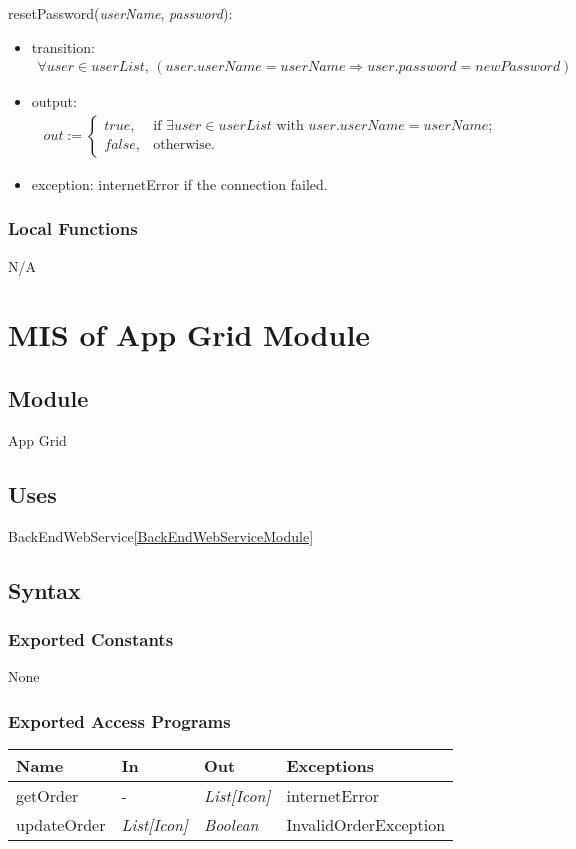 \documentclass[12pt, titlepage]{article}
\begin{document}
\noindent resetPassword(\textit{userName}, \textit{password}):
\begin{itemize}
\item transition: 
\begin{align*}
\forall user \in userList, \, (user.userName = userName \Rightarrow user.password = newPassword)
\end{align*}

\item output: 
\begin{align*}
out := \begin{cases}
true, & \text{if } \exists user \in userList \text{ with } user.userName = userName; \\
false, & \text{otherwise.}
\end{cases}
\end{align*}

\item exception: internetError if the connection failed.
\end{itemize}

\subsubsection{Local Functions}
N/A

\newpage
\section{MIS of App Grid Module} \label{AGModule}

\subsection{Module}
App Grid

\subsection{Uses}
BackEndWebService\ref{BackEndWebServiceModule}

\subsection{Syntax}

\subsubsection{Exported Constants}
None

\subsubsection{Exported Access Programs}
\begin{center}
\begin{tabular}{p{4cm} p{3cm} p{3cm} p{3cm}}
\hline
\textbf{Name} & \textbf{In} & \textbf{Out} & \textbf{Exceptions} \\
\hline
getOrder & - & \textit{List[Icon]} & internetError \\
updateOrder & \textit{List[Icon]} & \textit{Boolean} & InvalidOrderException \\
\hline
\end{tabular}
\end{center}
\end{document}
